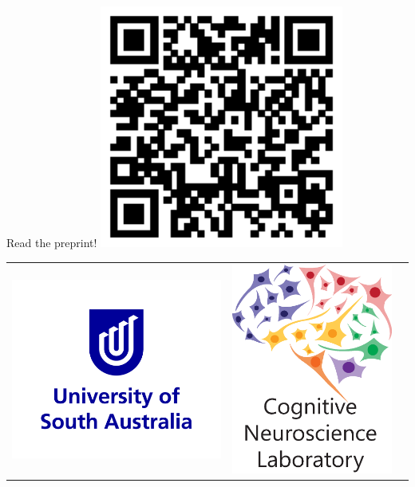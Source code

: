 \documentclass[final]{beamer}
\begin{document}
\begin{frame}{}
\begin{textblock}{18}
\begin{block}{Read the preprint!}
\centering
\includegraphics[width=0.6\textwidth]{arxiv-url.eps}
%

\end{block}

\begin{block}{}
\begin{tabular}{c c c}
\includegraphics[width=.55\linewidth]{logo_unisa_RGB-blue.png} &   \includegraphics[width=.4\linewidth]{cnl-color.eps} & \\
\end{tabular}

\end{block}


\end{textblock}

\end{frame}
\end{document}
